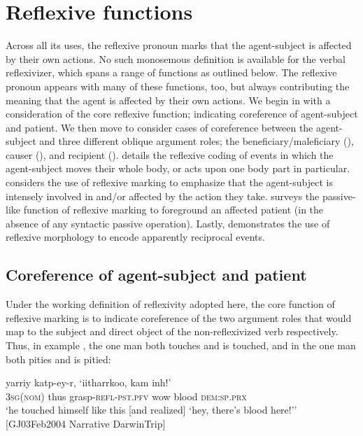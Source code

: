 \documentclass[output=paper]{langscibook}
\begin{document}
\section{Reflexive functions}\label{sec:Gaby:4}
Across all its uses, the reflexive pronoun marks that the agent-subject is affected by their own actions. No such monosemous definition is available for the verbal reflexivizer, which spans a range of functions as outlined below. The reflexive pronoun appears with many of these functions, too, but always contributing the meaning that the agent is affected by their own actions. We begin in  with a consideration of the core reflexive function; indicating coreference of agent-subject and patient. We then move to consider cases of coreference between the agent-subject and three different oblique argument roles; the beneficiary/maleficiary (), causer (), and recipient ().  details the reflexive coding of events in which the agent-subject moves their whole body, or acts upon one body part in particular.  considers the use of reflexive marking to emphasize that the agent-subject is intensely involved in and/or affected by the action they take.  surveys the passive-like function of reflexive marking to foreground an affected patient (in the absence of any syntactic passive operation). Lastly,  demonstrates the use of reflexive morphology to encode apparently reciprocal events. 

\subsection{Coreference of agent-subject and patient}\label{sec:Gaby:4.1}
Under the working definition of reflexivity adopted here, the core function of reflexive marking is to indicate coreference of the two argument roles that would map to the subject and direct object of the non-reflexivized verb respectively. Thus, in example , the one man both touches and is touched, and in  the one man both pities and is pitied:

\ea 
    \label{ex:Gaby:16}
      {yarriy}  {katp-ey-r,}  {‘iitharrkoo,}  {kam}  {inh!’}\\
    \textsc{3sg}(\textsc{nom})  thus  grasp-\textsc{refl-pst.pfv}  wow  blood  \textsc{dem:sp.prx}\\
    \glt ‘he touched himself like this [and realized] ‘hey, there’s blood here!’’ 
[GJ03Feb2004 Narrative DarwinTrip]
    \z
\end{document}
